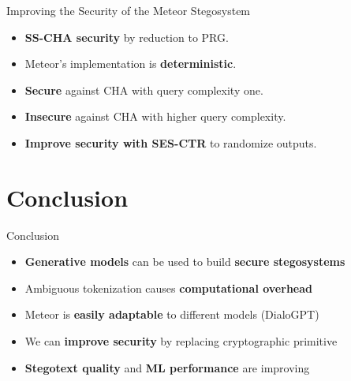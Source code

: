 \documentclass[10pt]{beamer}
\begin{document}
\begin{frame}{Improving the Security of the Meteor Stegosystem}
	\begin{itemize}[<+->]
		\item \textbf{SS-CHA security} by reduction to PRG.
		\item Meteor's implementation is \textbf{deterministic}.
		\item \textbf{Secure} against CHA with query complexity one.
		\item \textbf{Insecure} against CHA with higher query complexity.
		\item \textbf{Improve security with SES-CTR} to randomize outputs.
	\end{itemize}
\end{frame}

\section{Conclusion}

\begin{frame}{Conclusion}
    \begin{itemize}[<+->]
        \item \textbf{Generative models} can be used to build \textbf{secure stegosystems}
        \item Ambiguous tokenization causes \textbf{computational overhead}
        \item Meteor is \textbf{easily adaptable} to different models (DialoGPT)
        \item We can \textbf{improve security} by replacing cryptographic primitive
        \item \textbf{Stegotext quality} and \textbf{ML performance} are improving
    \end{itemize}
\end{frame}
    
\end{document}

